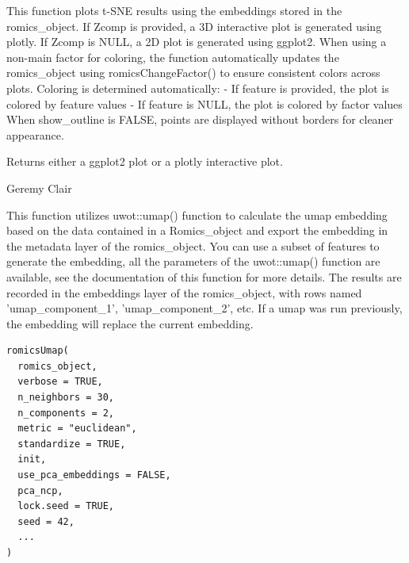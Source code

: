 \documentclass[a4paper]{book}
\begin{document}
%
\begin{Details}
This function plots t-SNE results using the embeddings stored in the romics\_object.
If Zcomp is provided, a 3D interactive plot is generated using plotly.
If Zcomp is NULL, a 2D plot is generated using ggplot2.
When using a non-main factor for coloring, the function automatically updates the romics\_object
using romicsChangeFactor() to ensure consistent colors across plots.
Coloring is determined automatically:
- If feature is provided, the plot is colored by feature values
- If feature is NULL, the plot is colored by factor values
When show\_outline is FALSE, points are displayed without borders for cleaner appearance.
\end{Details}
%
\begin{Value}
Returns either a ggplot2 plot or a plotly interactive plot.
\end{Value}
%
\begin{Author}
Geremy Clair
\end{Author}
%
\begin{Description}
This function utilizes uwot::umap() function to calculate the umap embedding based on the data contained in a Romics\_object and export the embedding in the metadata layer of the romics\_object.
You can use a subset of features to generate the embedding, all the parameters of the uwot::umap() function are available, see the documentation of this function for more details.
The results are recorded in the embeddings layer of the romics\_object, with rows named 'umap\_component\_1', 'umap\_component\_2', etc.
If a umap was run previously, the embedding will replace the current embedding.
\end{Description}
%
\begin{Usage}
\begin{verbatim}
romicsUmap(
  romics_object,
  verbose = TRUE,
  n_neighbors = 30,
  n_components = 2,
  metric = "euclidean",
  standardize = TRUE,
  init,
  use_pca_embeddings = FALSE,
  pca_ncp,
  lock.seed = TRUE,
  seed = 42,
  ...
)
\end{verbatim}
\end{Usage}
%
\end{document}

